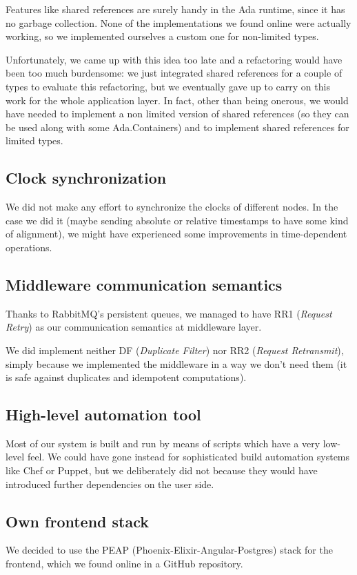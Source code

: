 Features like shared references are surely handy in the Ada runtime, since it
has no garbage collection. None of the implementations we found online were
actually working, so we implemented ourselves a custom one for non-limited
types.

Unfortunately, we came up with this idea too late and a refactoring would have
been too much burdensome: we just integrated shared references for a couple of
types to evaluate this refactoring, but we eventually gave up to carry on this
work for the whole application layer.
In fact, other than being onerous, we would have needed to implement a non
limited version of shared references (so they can be used along with some
Ada.Containers) and to implement shared references for limited types.

\subsection{Clock synchronization}
We did not make any effort to synchronize the clocks of different nodes.
In the case we did it (maybe sending absolute or relative timestamps to have 
some kind of alignment), we might have experienced some improvements in
time-dependent operations.

\subsection{Middleware communication semantics}
Thanks to RabbitMQ's persistent queues, we managed to have RR1
(\textit{Request Retry}) as our communication semantics at middleware layer.

We did implement neither DF (\textit{Duplicate Filter}) nor RR2
(\textit{Request Retransmit}), simply because we implemented the middleware in
a way we don't need them (it is safe against duplicates and idempotent
computations).

\subsection{High-level automation tool}
Most of our system is built and run by means of scripts which have a very
low-level feel. We could have gone instead for sophisticated build automation
systems like Chef or Puppet, but we deliberately did not because they would
have introduced further dependencies on the user side.

\subsection{Own frontend stack}
We decided to use the PEAP (Phoenix-Elixir-Angular-Postgres) stack for the
frontend, which we found online in a GitHub repository.

